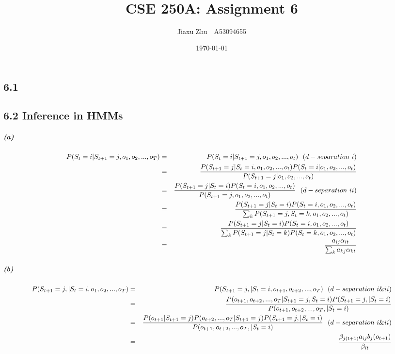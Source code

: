 \documentclass{article}
\newcommand{\RNum}[1]{\uppercase\expandafter{\romannumeral #1\relax}}
\begin{document}
\title{CSE 250A: Assignment 6}
\author{Jiaxu Zhu~~A53094655}
\date{\today}
\maketitle
\subsection*{6.1}



\subsection*{6.2 Inference in HMMs}
\subparagraph*{(a)}
\begin{eqnarray*}
	P(S_t=i | S_{t+1}=j, o_1, o_2, ..., o_T ) &=& P(S_t=i | S_{t+1}=j, o_1, o_2, ..., o_{t} )~~(d-separation~\RNum{1})\\
	&=& \frac{P(S_{t+1}=j | S_{t}=i, o_1, o_2, ..., o_{t} )P(S_t=i |o_1, o_2, ..., o_{t} )}{P(S_{t+1}=j| o_1, o_2, ..., o_{t} )}\\
	&=& \frac{P(S_{t+1}=j | S_{t}=i )P(S_t=i , o_1, o_2, ..., o_{t} )}{P(S_{t+1}=j, o_1, o_2, ..., o_{t} )}~~(d-separation~\RNum{2})\\
	&=& \frac{P(S_{t+1}=j | S_{t}=i )P(S_t=i , o_1, o_2, ..., o_{t} )}{\sum_k P(S_{t+1}=j, S_t=k, o_1, o_2, ..., o_{t} )}\\
	&=& \frac{P(S_{t+1}=j | S_{t}=i )P(S_t=i , o_1, o_2, ..., o_{t} )}{\sum_k P(S_{t+1}=j | S_t=k)P(S_t=k, o_1, o_2, ..., o_{t} )}\\
	&=& \frac{a_{ij}\alpha_{it}}{\sum_{k} a_{kj}\alpha_{kt}}
\end{eqnarray*}

\subparagraph*{(b)}
\begin{eqnarray*}
	P(S_{t+1}=j, |S_t=i , o_1, o_2, ..., o_T ) &=& P(S_{t+1}=j, |S_t=i , o_{t+1}, o_{t+2}, ..., o_T )~~(d-separation~\RNum{1}\&\RNum{2})\\
	&=& \frac{P(o_{t+1}, o_{t+2}, ..., o_T | S_{t+1}=j, S_t=i)P(S_{t+1}=j, |S_t=i )}{P(o_{t+1}, o_{t+2}, ..., o_T, |S_t=i)}\\
	&=& \frac{P(o_{t+1}|S_{t+1}=j)P(o_{t+2}, ..., o_T | S_{t+1}=j)P(S_{t+1}=j, |S_t=i )}{P(o_{t+1}, o_{t+2}, ..., o_T, |S_t=i)}~~(d-separation~\RNum{1}\&\RNum{2})\\
	&=& \frac{\beta_{j(t+1)}a_{ij}b_j(o_{t+1})}{\beta_{it}}
\end{eqnarray*}
\end{document}
